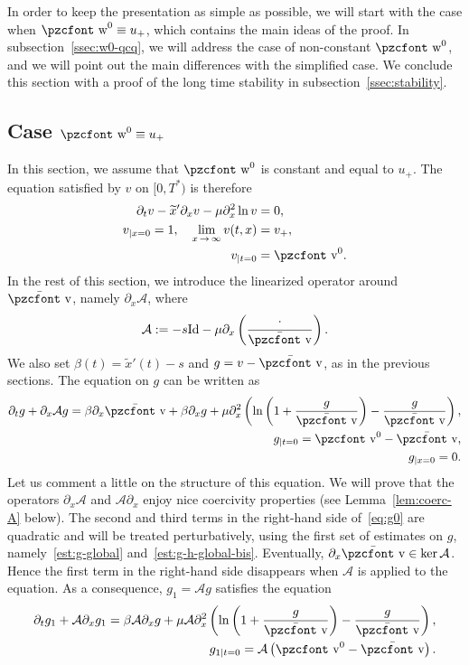 \documentclass[10pt]{amsart}
\theoremstyle{definition}\newtheorem{defi}[theo]{Definition}\newtheorem{rema}[theo]{Remark}\newtheorem{exam}[theo]{Example}\newtheorem{exem}[theo]{Example}\newtheorem{nota}[theo]{Notation}
\newcommand{\mathpzc}[1]{\text{\pzcfont #1}}
\newcommand{\p}{\partial}
\newcommand{\bv}{\bar{\mathpzc{v}}}
\newcommand{\cA}{\mathcal A}
\newcommand{\rId}{\mathrm{Id}}
\newcommand{\tv}{\mathpzc{v}}
\newcommand{\tw}{\mathpzc{w}}
\newcommand{\tx}{\widetilde{x}}
\begin{document}
In order to keep the presentation as simple as possible, we will start with the case when $\tw^0\equiv u_+$, which contains the main ideas of the proof. In subsection~\ref{ssec:w0-qcq}, we will address the case of non-constant $\tw^0$, and we will point out the main differences with the simplified case. We conclude this section with a proof of the long time stability in subsection~\ref{ssec:stability}.

\subsection{Case \texorpdfstring{$\tw^0\equiv u_+$}{w0 cst}}

In this section, we assume that $\tw^0$ is constant and equal to $u_+$. The equation satisfied by $v$ on $[0,T^*)$ is therefore
\begin{align*}
\p_t v - \tx' \p_x v - \mu \p_x^2 \ln v &=0,\\
v_{|x=0}=1, \quad \lim_{x\,\to\,\infty}v(t,x) &=v_+,\\
v_{|t=0} &=\tv^0.
\end{align*}
In the rest of this section, we introduce the linearized operator around $\bv$, namely $\p_x \cA$, where
\[
\cA:=-s \rId - \mu \p_x\left(\frac{\cdot}{\bv}\right).
\]
We also set $\beta(t)=\tx'(t)-s$ and $g=v-\bv$, as in the previous sections. The equation on $g$ can be written as
\begin{equation}\label{eq:g0}
\begin{split}
\p_t g + \p_x \cA g= \beta \p_x \bv + \beta \p_x g + \mu \p_x^2\left(\ln\left(1+ \frac{g}{\bv}\right) - \frac{g}{\bv}\right),\\
g_{|t=0}=\tv^0-\bv,\\
g_{|x=0}=0.
\end{split}
\end{equation} 
Let us comment a little on the structure of this equation. We will prove that the operators $\p_x \cA$ and $\cA \p_x$ enjoy nice coercivity properties (see Lemma~\ref{lem:coerc-A} below). The second and third terms in the right-hand side of~\eqref{eq:g0} are quadratic and will be treated perturbatively, using the first set of estimates on $g$, namely~\eqref{est:g-global} and~\eqref{est:g-h-global-bis}. Eventually, $\p_x \bv\in \ker \cA$. Hence the first term in the right-hand side disappears when $\cA$ is applied to the equation. As a consequence, $g_1=\cA g$ satisfies the equation
\begin{equation}\label{eq:g1}
\begin{split}
\p_t g_1 + \cA \p_x g_1= \beta \cA \p_x g + \mu \cA \p_x^2\left(\ln\left(1+ \frac{g}{\bv}\right) - \frac{g}{\bv}\right),\\
g_{1|t=0}=\cA\left(\tv^0-\bv\right).
\end{split}
\end{equation}
\end{document}
